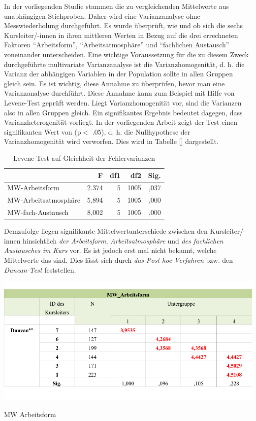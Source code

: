 \documentclass[12pt,a4paper]{article}
\begin{document}
In der vorliegenden Studie stammen die zu vergleichenden Mittelwerte aus unabhängigen Stichproben. Daher wird eine Varianzanalyse ohne Messwiederholung durchgeführt. Es wurde überprüft, wie und ob sich die sechs Kurs\-lei\-ter/-innen in ihren mittleren Werten in Bezug auf die drei errechneten Faktoren "`Arbeitsform"', "`Arbeitsatmosphäre"' und "`fachlichen Austausch"' voneinander unterscheiden. Eine wichtige Voraussetzung für die zu diesem Zweck durchgeführte multivariate Varianzanalyse ist die Varianzhomogenität, d. h. die Varianz der abhängigen Variablen in der Population sollte in allen Gruppen gleich sein. Es ist wichtig, diese Annahme zu überprüfen, bevor man eine Varianzanalyse durchführt. Diese Annahme kann zum Beispiel mit Hilfe von Levene-Test geprüft werden. Liegt Varianzhomogenität vor, sind die Varianzen also in allen Gruppen gleich. Ein signifikantes Ergebnis bedeutet dagegen, dass Varianzheterogenität vorliegt. In der vorliegenden Arbeit zeigt der Test einen signifikanten Wert von (p$<$ .05), d. h. die Nullhypothese der Varianzhomogenität wird verworfen. 
Dies wird in Tabelle \ref{} dargestellt.



\begin{table}
\begin{center}
\begin{tabular}{|l|r|r|r|r|}
\hline 
 & F & df1 & df2 & Sig. \\ 
\hline 
MW-Arbeitsform & 2.374 & 5 & 1005 & ,037 \\ 
\hline 
MW-Arbeitsatmosphäre & 5,894 & 5 & 1005 & ,000 \\ 
\hline 
MW-fach-Austausch & 8,002 & 5 & 1005 & ,000 \\ 
\hline 
\end{tabular} 
\end{center}
\caption{Levene-Test auf Gleichheit der Fehlervarianzen}
\end{table}
\FloatBarrier

Demzufolge liegen signifikante Mittelwertunterschiede zwischen den Kurs\-lei\-ter/-in\-nen hinsichtlich \textit{der Arbeitsform}, \textit{Arbeitsatmosphäre} und \textit{des fachlichen Austausches im Kurs} vor. Es ist jedoch erst mal nicht bekannt, welche Mittelwerte das sind. Dies lässt sich durch  \textit{das Post-hoc-Verfahren} bzw. den \textit{Duncan-Test} feststellen.


\begin{table}[!ht]
\includegraphics[scale=0.85]{tab01.pdf}
\caption{MW Arbeitsform}
\label{tab.6}
\end{table}
\FloatBarrier
\end{document}
